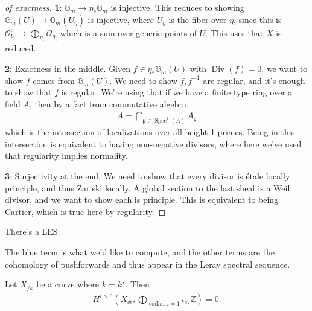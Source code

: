 \begin{proof}[of exactness]

\textbf{1}: \({\mathbb{G}}_m \to \eta_* {\mathbb{G}}_m\) is injective.
This reduces to showing \({\mathbb{G}}_m(U) \to {\mathbb{G}}_m(U_\eta)\)
is injective, where \(U_\eta\) is the fiber over \(\eta\), since this is
\({\mathcal{O}}_U^{\times}\to \bigoplus_{\eta_i} {\mathcal{O}}_{\eta_i}\)
which is a sum over generic points of \(U\). This uses that \(X\) is
reduced.

\textbf{2}: Exactness in the middle. Given
\(f\in \eta_* {\mathbb{G}}_m(U)\) with \(\operatorname{Div}(f) = 0\), we
want to show \(f\) comes from \({\mathbb{G}}_m(U)\). We need to show
\(f, f^{-1}\) are regular, and it's enough to show that \(f\) is
regular. We're using that if we have a finite type ring over a field
\(A\), then by a fact from commutative algebra,
\begin{align*}
A = \bigcap_{\mathfrak{p}\in \operatorname{Spec}^1(A)} A_{\mathfrak{p}}
\end{align*}
which is the intersection of localizations over all height 1 primes.
Being in this intersection is equivalent to having non-negative
divisors, where here we've used that regularity implies normality.

\textbf{3}: Surjectivity at the end. We need to show that every divisor
is étale locally principle, and thus Zariski locally. A global section
to the last sheaf is a Weil divisor, and we want to show each is
principle. This is equivalent to being Cartier, which is true here by
regularity.

\end{proof}

\begin{corollary}[?]

There's a LES:

The blue term is what we'd like to compute, and the other terms are the
cohomology of pushforwards and thus appear in the Leray spectral
sequence.

\end{corollary}

\begin{proposition}[?]

Let \(X_{/k}\) be a curve where \(k=k^{s}\). Then
\begin{align*}  
H^{i>0}(X_\text{ét}, \bigoplus_{\operatorname{codim}z = 1} \iota_{z_*} {\mathbb{Z}}) = 0
.\end{align*}

\end{proposition}

